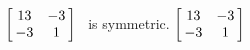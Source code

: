 {$\left[\hskip -3pt \begin{array}{cc} 13&-3\\  -3&1\end {array} \hskip -3pt
 \right]$} 
{\tta\ is symmetric. $\left[\hskip -3pt \begin{array}{cc} 13&-3\\  -3&1\end {array} \hskip -3pt
 \right]$}


  


